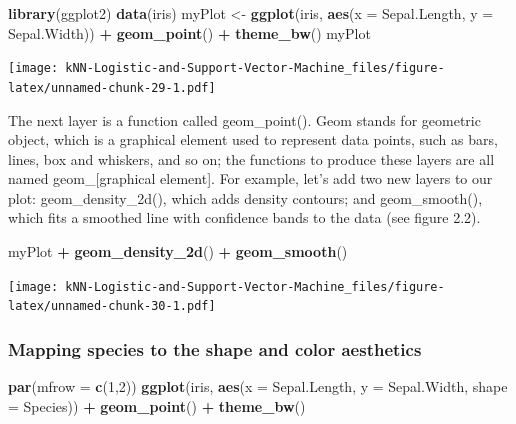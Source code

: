 \documentclass[
]{article}
\newenvironment{Shaded}{\begin{snugshade}}{\end{snugshade}}
\newcommand{\AttributeTok}[1]{\textcolor[rgb]{0.13,0.29,0.53}{#1}}
\newcommand{\DecValTok}[1]{\textcolor[rgb]{0.00,0.00,0.81}{#1}}
\newcommand{\FunctionTok}[1]{\textcolor[rgb]{0.13,0.29,0.53}{\textbf{#1}}}
\newcommand{\NormalTok}[1]{#1}
\newcommand{\OtherTok}[1]{\textcolor[rgb]{0.56,0.35,0.01}{#1}}
\newcommand{\SpecialCharTok}[1]{\textcolor[rgb]{0.81,0.36,0.00}{\textbf{#1}}}
\begin{document}
\begin{Shaded}
\begin{Highlighting}[]
\FunctionTok{library}\NormalTok{(ggplot2)}
\FunctionTok{data}\NormalTok{(iris)}
\NormalTok{myPlot }\OtherTok{\textless{}{-}} \FunctionTok{ggplot}\NormalTok{(iris, }\FunctionTok{aes}\NormalTok{(}\AttributeTok{x =}\NormalTok{ Sepal.Length, }\AttributeTok{y =}\NormalTok{ Sepal.Width)) }\SpecialCharTok{+}
  \FunctionTok{geom\_point}\NormalTok{() }\SpecialCharTok{+}
  \FunctionTok{theme\_bw}\NormalTok{()}
\NormalTok{myPlot}
\end{Highlighting}
\end{Shaded}

\texttt{[image: kNN-Logistic-and-Support-Vector-Machine\_files/figure-latex/unnamed-chunk-29-1.pdf]}

The next layer is a function called geom\_point(). Geom stands for
geometric object, which is a graphical element used to represent data
points, such as bars, lines, box and whiskers, and so on; the functions
to produce these layers are all named geom\_{[}graphical element{]}. For
example, let's add two new layers to our plot: geom\_density\_2d(),
which adds density contours; and geom\_smooth(), which fits a smoothed
line with confidence bands to the data (see figure 2.2).

\begin{Shaded}
\begin{Highlighting}[]
\NormalTok{myPlot }\SpecialCharTok{+}
  \FunctionTok{geom\_density\_2d}\NormalTok{() }\SpecialCharTok{+}
  \FunctionTok{geom\_smooth}\NormalTok{()}
\end{Highlighting}
\end{Shaded}

\texttt{[image: kNN-Logistic-and-Support-Vector-Machine\_files/figure-latex/unnamed-chunk-30-1.pdf]}

\subsubsection{Mapping species to the shape and color
aesthetics}\label{mapping-species-to-the-shape-and-color-aesthetics}

\begin{Shaded}
\begin{Highlighting}[]
\FunctionTok{par}\NormalTok{(}\AttributeTok{mfrow =} \FunctionTok{c}\NormalTok{(}\DecValTok{1}\NormalTok{,}\DecValTok{2}\NormalTok{))}
\FunctionTok{ggplot}\NormalTok{(iris, }\FunctionTok{aes}\NormalTok{(}\AttributeTok{x =}\NormalTok{ Sepal.Length, }\AttributeTok{y =}\NormalTok{ Sepal.Width, }\AttributeTok{shape =}\NormalTok{ Species)) }\SpecialCharTok{+}
  \FunctionTok{geom\_point}\NormalTok{() }\SpecialCharTok{+}
  \FunctionTok{theme\_bw}\NormalTok{()}
\end{Highlighting}
\end{Shaded}
\end{document}
